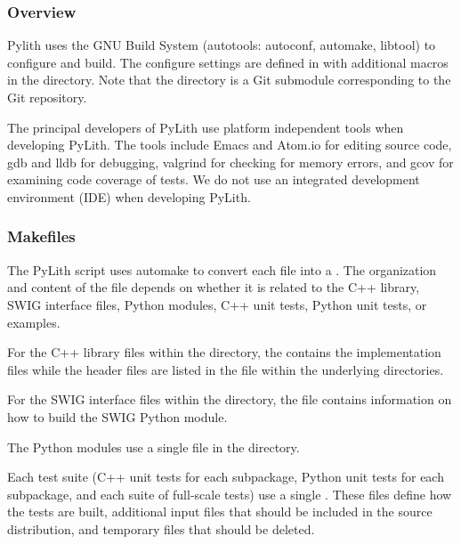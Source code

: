 
\subsubsection{Overview}

Pylith uses the GNU Build System (autotools: autoconf, automake,
libtool) to configure and build. The configure settings are defined in
 with additional macros in the 
directory. Note that the  directory is a Git submodule
corresponding to the  Git repository.

The principal developers of PyLith use platform independent tools when
developing PyLith. The tools include Emacs and Atom.io for editing
source code, gdb and lldb for debugging, valgrind for checking for
memory errors, and gcov for examining code coverage of tests. We do
not use an integrated development environment (IDE) when developing
PyLith.

\subsubsection{Makefiles}

The PyLith  script uses automake to convert each
 file into a . The
organization and content of the  file depends on
whether it is related to the C++ library, SWIG interface files, Python
modules, C++ unit tests, Python unit tests, or examples.

For the C++ library files within the  directory, the
 contains the implementation files while
the header files are listed in the  file within
the underlying directories.

For the SWIG interface files within the 
directory, the  file contains information on how
to build the SWIG Python module.

The Python modules use a single  file in
the  directory.

Each test suite (C++ unit tests for each subpackage, Python unit tests
for each subpackage, and each suite of full-scale tests) use a single
. These files define how the tests are built,
additional input files that should be included in the source
distribution, and temporary files that should be deleted.

